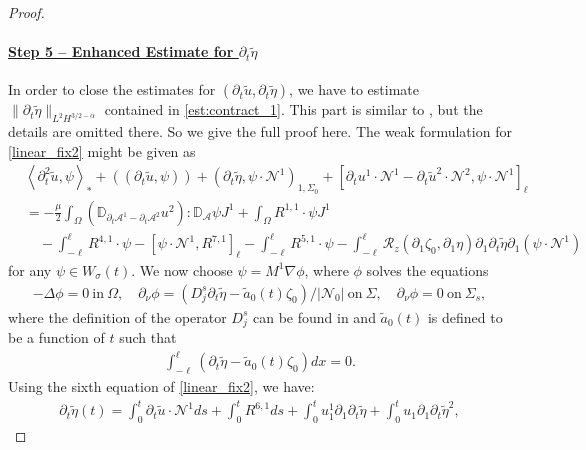 \documentclass[letterpaper,reqno,10pt,twoside]{amsart}
\theoremstyle{definition}
\theoremstyle{remark}
\def\p{\partial}
\def\Om{\Omega}
\begin{document}
\begin{proof}
			\paragraph{\underline{Step 5 -- Enhanced Estimate for $\p_t\tilde{\eta}$}}
			In order to close the estimates for $(\p_t\tilde{u}, \p_t\tilde{\eta})$, we have to estimate $\|\p_t\tilde{\eta}\|_{L^2H^{3/2-\alpha}}$ contained in \eqref{est:contract_1}. This part is similar to \cite[Proof of Theorem 9.3]{GT2020}, but the details are omitted there.  So we give the full proof here. The weak formulation for \eqref{linear_fix2} might be given as
			\begin{equation}\label{enhance_1}
				\begin{aligned}
					&\left<\p_t^2\tilde{u},\psi\right>_\ast+((\p_t\tilde{u},\psi))+(\p_t\tilde{\eta},\psi\cdot\mathcal{N}^1)_{1,\Sigma_{0}}+[\p_t{u}^{1}\cdot\mathcal{N}^1-\p_{t}\tilde{u}^{2}\cdot \mathcal{N}^{2},\psi\cdot\mathcal{N}^1]_{\ell}\\
					&=-\frac\mu2\int_\Om\left( \mathbb{D}_{\p_t\mathcal{A}^1-\p_t\mathcal{A}^2}{u}^2\right):\mathbb{D}_{\mathcal{A}}\psi J^1+\int_{\Om}R^{1,1}\cdot \psi J^1\\
					&\quad-\int_{-\ell}^{\ell}R^{4,1}\cdot \psi-[\psi\cdot\mathcal{N}^1,R^{7,1}]_\ell-\int_{-\ell}^{\ell} R^{5,1}\cdot \psi-\int_{-\ell}^{\ell}\mathcal{R}_{z}(\p_{1}\zeta_{0},\p_{1}\eta)\p_{1}\p_{t}\tilde{\eta} \p_{1}(\psi\cdot \mathcal{N}^{1})
				\end{aligned}
			\end{equation}
			for any $\psi\in W_\sigma(t)$. We now choose $\psi=M^1\nabla\phi$, where $\phi$ solves the equations
			\begin{align*}
				-\Delta\phi=0 \ \text{in} \ \Om,\quad
				\p_\nu\phi=(D_j^s\p_t\tilde{\eta}-\tilde{a}_{0}(t)\zeta_{0})/|\mathcal{N}_0| \ \text{on} \ \Sigma,\quad
				\p_\nu\phi=0 \ \text{on} \ \Sigma_s ,
			\end{align*}
			where the definition of the operator $ D_j^s$ can  be found in \cite[Section 8]{GT2020} and $\tilde{a}_{0}(t)$ is defined to be a function of $t$ such that
			\begin{align}
				\int_{-\ell}^{\ell}(\p_{t}\tilde{\eta}-\tilde{a}_{0}(t)\zeta_{0})dx=0.
			\end{align}
			Using the sixth equation of \eqref{linear_fix2}, we have:
			\begin{align}
				\p_{t}\tilde{\eta}(t)=\int_{0}^{t}\p_{t}\tilde{u}\cdot \mathcal{N}^{1}ds+\int_{0}^{t}R^{6,1}ds+\int_{0}^{t}u_{1}^{1}\p_{1}\p_{t}\tilde{\eta}+\int_{0}^{t}u_{1}\p_{1}\p_{t}\tilde{\eta}^{2},

\end{align}
\end{proof}
\end{document}
